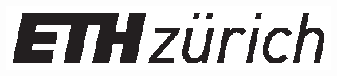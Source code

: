
\begin{titlepage}

\includegraphics{gfx/eth_logo_kurz_pos.eps}

\begin{addmargin}[-1cm]{-3cm}
\begin{center}
\large

\hfill
\vfill

\begingroup
\spacedallcaps{\myTitle} \\ \bigskip %
\endgroup

\spacedlowsmallcaps{\myName} %

\vfill


\myDepartment \\
\myUni \\ \bigskip

\myTime\ %

\vfill

\end{center}
\end{addmargin}


\end{titlepage}